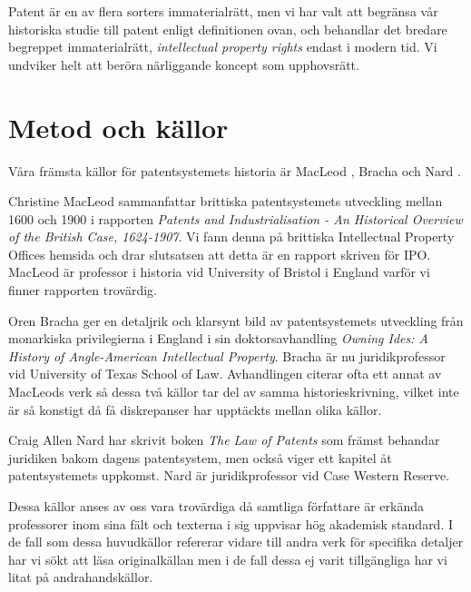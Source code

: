 Patent är en av flera sorters immaterialrätt, men vi har valt att begränsa vår historiska studie till patent enligt definitionen ovan, och behandlar det bredare begreppet immaterialrätt, \emph{intellectual property rights} endast i modern tid.
Vi undviker helt att beröra närliggande koncept som upphovsrätt.

\section{Metod och källor}

Våra främsta källor för patentsystemets historia är MacLeod \cite{macleod},
Bracha \cite{bracha} och Nard \cite{nard}.

Christine MacLeod sammanfattar brittiska patentsystemets utveckling mellan 
1600 och 1900 i rapporten \emph{Patents and Industrialisation - An Historical 
Overview of the British Case, 1624-1907}. Vi fann denna på brittiska 
Intellectual Property Offices hemsida och drar slutsatsen att detta är en 
rapport skriven för IPO. MacLeod är professor i historia vid University of 
Bristol i England varför vi finner rapporten trovärdig.

Oren Bracha ger en detaljrik och klarsynt bild av patentsystemets utveckling 
från monarkiska privilegierna i England i sin doktorsavhandling \emph{Owning 
Ides: A History of Angle-American Intellectual Property}. Bracha är nu 
juridikprofessor vid University of Texas School of Law. Avhandlingen citerar 
ofta ett annat av MacLeods verk så dessa två källor tar del av samma 
historieskrivning, vilket inte är så konstigt då få diskrepanser har upptäckts 
mellan olika källor.

Craig Allen Nard har skrivit boken \emph{The Law of Patents} som främst 
behandar juridiken bakom dagens patentsystem, men också viger ett kapitel åt 
patentsystemets uppkomst. Nard är juridikprofessor vid Case Western Reserve.

Dessa källor anses av oss vara trovärdiga då samtliga författare är erkända 
professorer inom sina fält och texterna i sig uppvisar hög akademisk standard. 
I de fall som dessa huvudkällor refererar vidare till andra verk för 
specifika detaljer har vi sökt att läsa originalkällan men i de fall dessa ej 
varit tillgängliga har vi litat på andrahandskällor.





